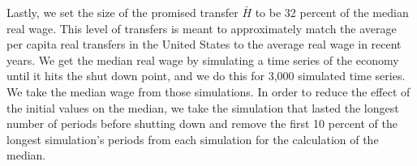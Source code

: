 \documentclass[letterpaper,12pt]{article}
\theoremstyle{definition}
\begin{document}
  Lastly, we set the size of the promised transfer $\bar{H}$ to be 32 percent of the median real wage. This level of transfers is meant to approximately match the average per capita real transfers in the United States to the average real wage in recent years. We get the median real wage by simulating a time series of the economy until it hits the shut down point, and we do this for 3,000 simulated time series. We take the median wage from those simulations. In order to reduce the effect of the initial values on the median, we take the simulation that lasted the longest number of periods before shutting down and remove the first 10 percent of the longest simulation's periods from each simulation for the calculation of the median.




\end{document}
